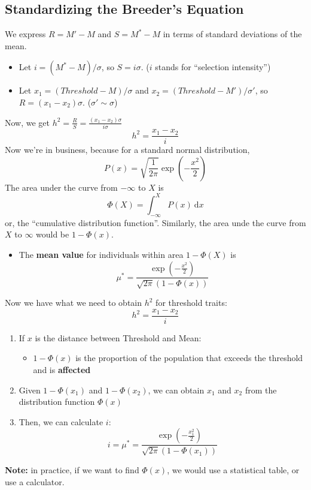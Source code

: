 \documentclass[10pt]{article}
\newcommand{\dd}{\text{d}}
\begin{document}
\subsection*{Standardizing the Breeder's Equation}
We express $R = M' - M$ and $S = M^* - M$ in terms of standard deviations of the mean.
\begin{itemize}
	\item Let $i = (M^* - M) / \sigma$, so $S = i\sigma$.  ($i$ stands for ``selection intensity'')
	\item Let $x_1 = (Threshold - M) / \sigma$ and $x_2 = (Threshold - M') / \sigma'$, so $R = (x_1 - x_2)\sigma$.  ($\sigma' \sim \sigma$)
\end{itemize}
Now, we get $h^2 = \frac{R}{S} = \frac{(x_1 - x_2) \sigma}{i \sigma}$
\[h^2 = \frac{x_1 - x_2}{i}\]
Now we're in business, because for a standard normal distribution,
\[P(x) = \sqrt{\frac{1}{2\pi}} \exp \left(-\frac{x^2}{2}\right)\]
The area under the curve from $-\infty$ to $X$ is
\[\Phi(X) = \int_{-\infty}^X P(x) \:\dd x\]
or, the ``cumulative distribution function''.  Similarly, the area unde the curve from $X$ to $\infty$ would be $1 - \Phi(x)$.
\begin{itemize}
	\item The \textbf{mean value} for individuals within area $1 - \Phi(X)$ is
	\[\mu^* = \frac{\exp\left(-\frac{x^2}{2}\right)}{\sqrt{2\pi} (1 - \Phi(x))}\]
\end{itemize}
Now we have what we need to obtain $h^2$ for threshold traits:
\[h^2 = \frac{x_1 - x_2}{i}\]
\begin{enumerate}
	\item If $x$ is the distance between Threshold and Mean:
	\begin{itemize}
	    \item $1 - \Phi(x)$ is the proportion of the population that exceeds the threshold and is \textbf{affected}
    \end{itemize}
    \item Given $1 - \Phi(x_1)$ and $1 - \Phi(x_2)$, we can obtain $x_1$ and $x_2$ from the distribution function $\Phi(x)$
    \item Then, we can calculate $i$:
    \[i = \mu^* = \frac{\exp \left(-\frac{x_1^2}{2}\right)}{\sqrt{2\pi} (1 - \Phi(x_1))}\]
\end{enumerate}
\textbf{Note:} in practice, if we want to find $\Phi(x)$, we would use a statistical table, or use a calculator.
\end{document}
